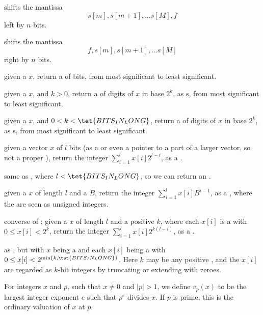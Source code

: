 shifts the mantissa
$$s[m], s[m+1],\ldots s[M], f$$
left by $n$ bits.

shifts the mantissa
$$f, s[m], s[m+1],\ldots s[M]$$
right by $n$ bits.


 given a  $x$, return a  of
bits, from most significant to least significant.

 given a  $x$, and
$k > 0$, return a  of digits of $x$ in base $2^k$, as s, from
most significant to least significant.

 given a  $x$, and $0 < k <
\tet{BITS_IN_LONG}$, return a  of digits of $x$ in base $2^k$, as
s, from most significant to least significant.

 given a vector $x$ of $l$ bits (as a
 or even a pointer to a part of a larger vector, so not a
proper ), return the integer $\sum_{i = 1}^l x[i] 2^{l-i}$, as a
.

 same as , where
$l < \tet{BITS_IN_LONG}$, so we can return an .

given a  $x$ of length $l$ and a  $B$,
return the integer $\sum_{i = 1}^l x[i] B^{i-1}$, as a ,
where the  are seen as unsigned integers.

 converse of ;
given a  $x$ of length $l$ and a positive  $k$,
where each $x[i]$ is a  with $0\leq x[i] < 2^k$, return the
integer $\sum_{i = 1}^l x[i] 2^{k(l-i)}$, as a .

 as , but
with $x$ being a  and each $x[i]$ being a 
with $0\leq x[i] < 2^{\min\{k,\tet{BITS_IN_LONG}\}}$.  Here $k$ may be
any positive , and the $x[i]$ are regarded as $k$-bit
integers by truncating or extending with zeroes.

For integers $x$ and $p$, such that $x\neq 0$ and $|p| > 1$, we define
$v_p(x)$ to be the largest integer exponent $e$ such that $p^e$ divides $x$.
If $p$ is prime, this is the ordinary valuation of $x$ at $p$.

